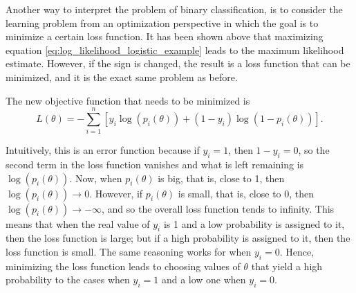 Another way to interpret the problem of binary classification, is to consider the learning problem from an optimization perspective in which the goal is to minimize a certain loss function. It has been shown above that maximizing equation \eqref{eq:log_likelihood_logistic_example} leads to the maximum likelihood estimate. However, if the sign is changed, the result is a loss function that can be minimized, and it is the exact same problem as before.

The new objective function that needs to be minimized is
\begin{equation}
  \label{eq:logistic_example_loss_function}
  L(\theta) = - \sum_{i = 1}^n \left[ y_i \log\left( p_i(\theta) \right) + (1 - y_i) \log \left( 1 - p_i(\theta) \right) \right].
\end{equation}

Intuitively, this is an error function because if $y_i = 1$, then $1 - y_i = 0$, so the second term in the loss function vanishes and what is left remaining is $\log\left( p_i(\theta) \right)$. Now, when $p_i(\theta)$ is big, that is, close to 1, then $\log\left( p_i(\theta) \right) \to 0$. However, if $p_i(\theta)$ is small, that is, close to 0, then $\log\left( p_i(\theta) \right) \to -\infty$, and so the overall loss function tends to infinity. This means that when the real value of $y_i$ is 1 and a low probability is assigned to it, then the loss function is large; but if a high probability is assigned to it, then the loss function is small. The same reasoning works for when $y_i = 0$.
Hence, minimizing the loss function leads to choosing values of $\theta$ that yield a high probability to the cases when $y_i = 1$ and a low one when $y_i = 0$.


